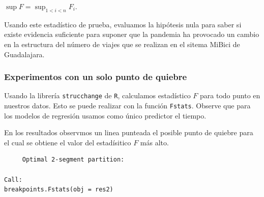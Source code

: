 \documentclass[
]{article}
\newenvironment{Shaded}{}{}
\newcommand{\AttributeTok}[1]{\textcolor[rgb]{0.49,0.56,0.16}{#1}}
\newcommand{\CommentTok}[1]{\textcolor[rgb]{0.38,0.63,0.69}{\textit{#1}}}
\newcommand{\DecValTok}[1]{\textcolor[rgb]{0.25,0.63,0.44}{#1}}
\newcommand{\FunctionTok}[1]{\textcolor[rgb]{0.02,0.16,0.49}{#1}}
\newcommand{\NormalTok}[1]{#1}
\newcommand{\OtherTok}[1]{\textcolor[rgb]{0.00,0.44,0.13}{#1}}
\newcommand{\SpecialCharTok}[1]{\textcolor[rgb]{0.25,0.44,0.63}{#1}}
\newcommand{\StringTok}[1]{\textcolor[rgb]{0.25,0.44,0.63}{#1}}
\begin{document}
\(\sup F = \sup_{1< i <n} F_i.\)

Usando este estadístico de prueba, evaluamos la hipótesis nula para
saber si existe evidencia suficiente para suponer que la pandemia ha
provocado un cambio en la estructura del número de viajes que se
realizan en el sitema MiBici de Guadalajara.

\newpage
\hypertarget{experimentos-con-un-solo-punto-de-quiebre}{%
\subsubsection{Experimentos con un solo punto de
quiebre}\label{experimentos-con-un-solo-punto-de-quiebre}}

Usando la librería \texttt{strucchange} de \texttt{R}, calculamos
estadístico \(F\) para todo punto en nuestros datos. Esto se puede
realizar con la función \texttt{Fstats}. Observe que para los modelos de
regresión usamos como único predictor el tiempo.

\begin{Shaded}
\end{Shaded}

En los resultados observmos un linea punteada el posible punto de
quiebre para el cual se obtiene el valor del estadísitico \(F\) más
alto.

\begin{verbatim}
	 Optimal 2-segment partition:

Call:
breakpoints.Fstats(obj = res2)
\end{verbatim}
\end{document}

